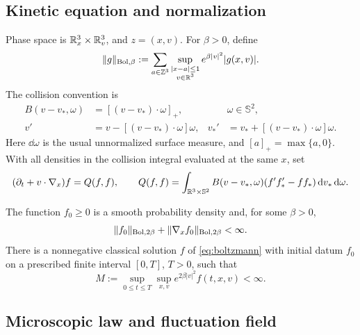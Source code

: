 \subsection{Kinetic equation and normalization}

Phase space is \(\mathbb R_x^3\times\mathbb R_v^3\), and \(z=(x,v)\).
For \(\beta>0\), define
\begin{equation}\label{eq:bol-norm}
 \|g\|_{\mathrm{Bol},\beta}
 :=\sum_{a\in\mathbb Z^3}
   \sup_{\substack{|x-a|\le1\\v\in\mathbb R^3}}
    e^{\beta|v|^2}|g(x,v)|.
\end{equation}
The collision convention is
\begin{align}
 B(v-v_*,\omega)&=[(v-v_*)\cdot\omega]_+,
   &&\omega\in\mathbb S^2,\label{eq:collision-kernel}\\
 v'&=v-[(v-v_*)\cdot\omega]\omega,
 &v_*'&=v_*+[(v-v_*)\cdot\omega]\omega.\label{eq:scattering}
\end{align}
Here \(\dd\omega\) is the usual unnormalized surface measure, and
\([a]_+=\max\{a,0\}\). With all densities in the collision integral
evaluated at the same \(x\), set
\begin{equation}\label{eq:boltzmann}
 (\partial_t+v\cdot\nabla_x)f=Q(f,f),\qquad
 Q(f,f)=\int_{\mathbb R^3\times\mathbb S^2}
 B(v-v_*,\omega)(f'f_*'-ff_*)\,\mathrm d v_*\,\mathrm d\omega.
\end{equation}

\begin{assumption}\label{ass:kinetic}
The function \(f_0\ge0\) is a smooth probability density and, for some
\(\beta>0\),
\begin{equation}\label{eq:initial-bol-bounds}
 \|f_0\|_{\mathrm{Bol},2\beta}
 +\|\nabla_xf_0\|_{\mathrm{Bol},2\beta}<\infty.
\end{equation}
There is a nonnegative classical solution \(f\) of \eqref{eq:boltzmann} with initial
datum \(f_0\) on a prescribed finite interval \([0,T]\), \(T>0\), such that
\begin{equation}\label{eq:kinetic-gaussian}
 M:=\sup_{0\le t\le T}\sup_{x,v}
       e^{2\beta|v|^2}f(t,x,v)<\infty.
\end{equation}
\end{assumption}

\subsection{Microscopic law and fluctuation field}


